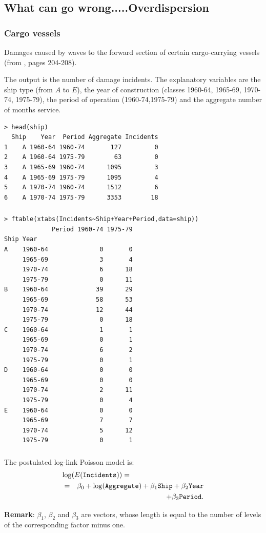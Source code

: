 \documentclass{beamer}
\newcommand{\bs}{\bigskip}
\begin{document}
\subsection{What can go wrong.....Overdispersion}

\begin{frame}[fragile]
\frametitle{Cargo vessels}

Damages caused by waves to the
forward section of certain cargo-carrying vessels (from ,
pages 204-208).

\bs
The output is the number of damage incidents. The explanatory variables are the
ship type (from $A$ to $E$), the year of construction (classes 1960-64, 1965-69,
1970-74, 1975-79), the period of operation (1960-74,1975-79) and the aggregate
number of months service.

{\scriptsize
\begin{verbatim}
> head(ship)
  Ship    Year  Period Aggregate Incidents
1    A 1960-64 1960-74       127         0
2    A 1960-64 1975-79        63         0
3    A 1965-69 1960-74      1095         3
4    A 1965-69 1975-79      1095         4
5    A 1970-74 1960-74      1512         6
6    A 1970-74 1975-79      3353        18
\end{verbatim}}
\end{frame}

\begin{frame}[fragile]
\frametitle{}
{\scriptsize
\begin{verbatim}
> ftable(xtabs(Incidents~Ship+Year+Period,data=ship))
             Period 1960-74 1975-79
Ship Year                          
A    1960-64              0       0
     1965-69              3       4
     1970-74              6      18
     1975-79              0      11
B    1960-64             39      29
     1965-69             58      53
     1970-74             12      44
     1975-79              0      18
C    1960-64              1       1
     1965-69              0       1
     1970-74              6       2
     1975-79              0       1
D    1960-64              0       0
     1965-69              0       0
     1970-74              2      11
     1975-79              0       4
E    1960-64              0       0
     1965-69              7       7
     1970-74              5      12
     1975-79              0       1
\end{verbatim}
}
\end{frame}

\begin{frame}
\frametitle{}
The postulated log-link Poisson model is:
\begin{eqnarray*}
\lefteqn{\log(E(\texttt{Incidents})) = \hspace*{4cm}}\\
& = & \beta_0 + \log(\texttt{Aggregate}) + \beta_1 \texttt{Ship} + \beta_2
\texttt{Year} \\
 & & + \beta_3 \texttt{Period}.
\end{eqnarray*}

\textbf{Remark}: $\beta_1$, $\beta_2$ and $\beta_3$ are vectors, whose length is
equal to the number of levels of the corresponding factor minus one.
\end{frame}
\end{document}
